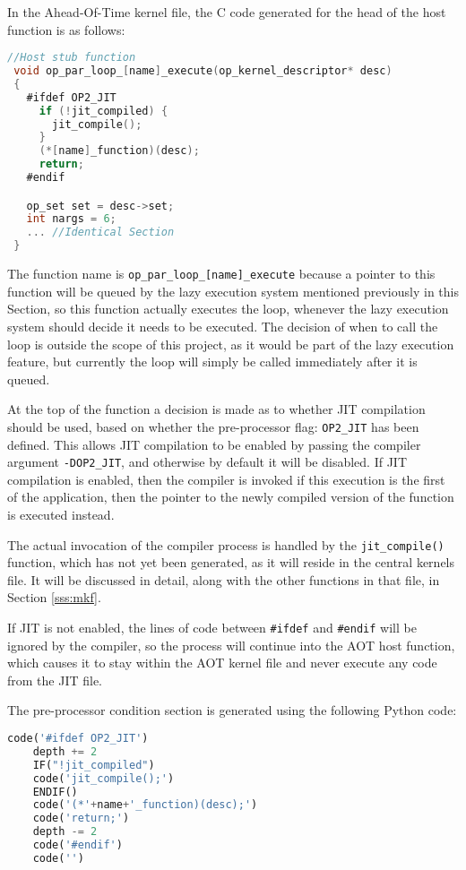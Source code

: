 In the Ahead-Of-Time kernel file, the C code generated for the head of the host function is as follows:

\begin{lstlisting}[linewidth = \textwidth, framesep=0pt, language=C, linebackgroundcolor={\ifnum\value{lstnumber}<15 \ifnum\value{lstnumber}>10 \color{red!20} \else \color{blue!20} \fi \else \color{blue!20} \fi}]
 //Host stub function
 void op_par_loop_[name]_execute(op_kernel_descriptor* desc)
 {
   #ifdef OP2_JIT
     if (!jit_compiled) {
       jit_compile();
     }
     (*[name]_function)(desc);
     return;
   #endif

   op_set set = desc->set;
   int nargs = 6;
   ... //Identical Section
 }
\end{lstlisting}


The function name is \verb|op_par_loop_[name]_execute| because a pointer to this function will be queued by the lazy execution system mentioned previously in this Section, so this function actually executes the loop, whenever the lazy execution system should decide it needs to be executed. The decision of when to call the loop is outside the scope of this project, as it would be part of the lazy execution feature, but currently the loop will simply be called immediately after it is queued.
\par At the top of the function a decision is made as to whether JIT compilation should be used, based on whether the pre-processor flag: \verb|OP2_JIT| has been defined. This allows JIT compilation to be enabled by passing the compiler argument \verb|-DOP2_JIT|, and otherwise by default it will be disabled. If JIT compilation is enabled, then the compiler is invoked if this execution is the first of the application, then the pointer to the newly compiled version of the function is executed instead.
\par
The actual invocation of the compiler process is handled by the \verb|jit_compile()| function, which has not yet been generated, as it will reside in the central kernels file. It will be discussed in detail, along with the other functions in that file, in Section \ref{sss:mkf}.
\par
If JIT is not enabled, the lines of code between \verb|#ifdef| and \verb|#endif| will be ignored by the compiler, so the process will continue into the AOT host function, which causes it to stay within the AOT kernel file and never execute any code from the JIT file.
\par
The pre-processor condition section is generated using the following Python code:
\begin{lstlisting}[backgroundcolor=\color{lightgray!20}, language=Python]
    code('#ifdef OP2_JIT')
    depth += 2
    IF("!jit_compiled")
    code('jit_compile();')
    ENDIF()
    code('(*'+name+'_function)(desc);')
    code('return;')
    depth -= 2
    code('#endif')
    code('')
\end{lstlisting}



